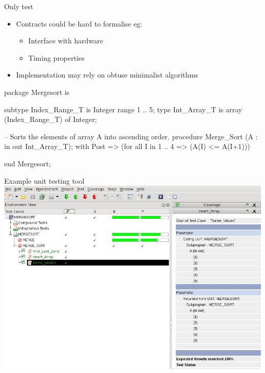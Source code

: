 \documentclass{beamer}
\begin{document}
\begin{frame}[fragile]{Only test}
  \begin{itemize}
     \item Contracts could be hard to formalise eg:
     \begin{itemize}
        \item Interface with hardware
        \item Timing properties
     \end{itemize}
     \item Implementation may rely on obtuse minimalist algorithms
  \end{itemize}
  \begin{pxcode}[language=SPARK,style=magic,gobble=0]
package Mergesort is

  subtype Index_Range_T is Integer range 1 .. 5;
  type    Int_Array_T   is array (Index_Range_T) of Integer;

  --  Sorts the elements of array A into ascending order.
  procedure Merge_Sort (A : in out Int_Array_T);
  with Post => (for all I in 1 .. 4 => (A(I) <= A(I+1)))

end Mergesort;     
  \end{pxcode}
\end{frame}
\begin{frame}[fragile]{Example unit testing tool}
  \includegraphics[width=\textwidth]{Mergesort_Same_Values_small.jpg}
\end{frame}
\end{document}
